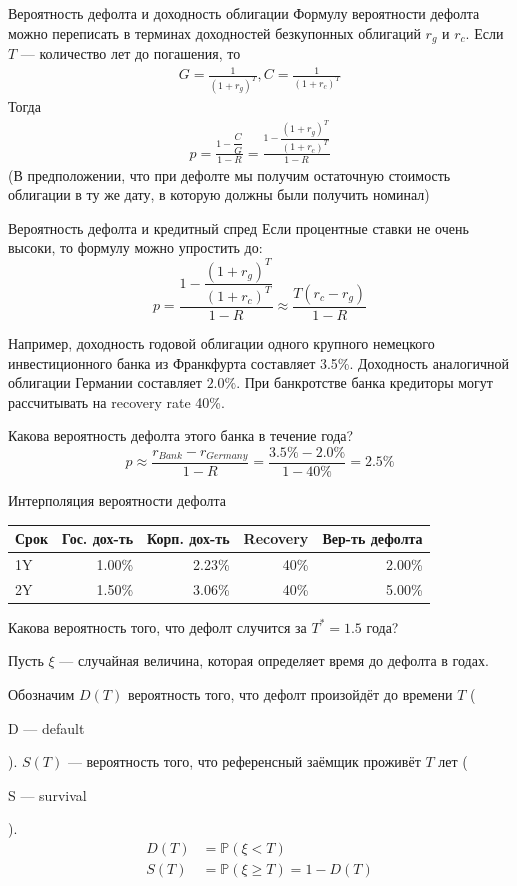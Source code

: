 \documentclass{beamer}
\newcommand{\en}[1]{\begin{otherlanguage}{english}#1\end{otherlanguage}}
\begin{document}
\begin{frame}{Вероятность дефолта и доходность облигации}
\justify
Формулу вероятности дефолта можно переписать в терминах доходностей безкупонных облигаций $r_g$ и $r_c$. Если $T$ --- количество лет до погашения, то
\begin{align*}
G = \frac{1}{(1 + r_g)^T}, C = \frac{1}{(1 + r_c)^T}
\end{align*}
Тогда
\begin{align*}
p = \frac{1 - \dfrac{C}{G}}{1-R} = \frac{1 - \dfrac{(1 + r_g)^T}{(1 + r_c)^T}}{1 - R}
\end{align*}
(В предположении, что при дефолте мы получим остаточную стоимость облигации в ту же дату, в которую должны были получить номинал)
\end{frame}



\begin{frame}{Вероятность дефолта и кредитный спред}
\justify
Если процентные ставки не очень высоки, то формулу можно упростить до:
\begin{equation*}
p = \frac{1 - \dfrac{(1 + r_g)^T}{(1 + r_c)^T}}{1 - R} \approx \frac{T(r_c - r_g)}{1 - R}
\end{equation*}

\justify
Например, доходность годовой облигации одного крупного немецкого инвестиционного банка из Франкфурта составляет 3.5\%. Доходность аналогичной облигации Германии составляет $2.0\%$. При банкротстве банка кредиторы могут рассчитывать на recovery rate 40\%.

\justify
Какова вероятность дефолта этого банка в течение года?
\begin{equation*}
p \approx \frac{r_{Bank} - r_{Germany}}{1-R} = \frac{3.5\% - 2.0\%}{1-40\%} = 2.5\%
\end{equation*}
\end{frame}



\begin{frame}{Интерполяция вероятности дефолта}
\centering
\begin{tabular}{l|r|r|r|r}
Срок & Гос. дох-ть & Корп. дох-ть & Recovery & Вер-ть дефолта \\ \hline
1Y & 1.00\% & 2.23\% & 40\% & 2.00\% \\
2Y & 1.50\% & 3.06\% & 40\% & 5.00\%
\end{tabular}

\justify
Какова вероятность того, что дефолт случится за $T^*=1.5$ года?

\justify
Пусть $\xi$ --- случайная величина, которая определяет время до дефолта в годах.

\justify
Обозначим $D(T)$ вероятность того, что дефолт произойдёт до времени $T$ (\en{D --- default}). $S(T)$ --- вероятность того, что референсный заёмщик проживёт $T$ лет (\en{S --- survival}).
\begin{align*}
D(T) &= \mathbb{P}(\xi < T) \\
S(T) &= \mathbb{P}(\xi \ge T) = 1 - D(T)
\end{align*}
\end{frame}
 
\end{document}

